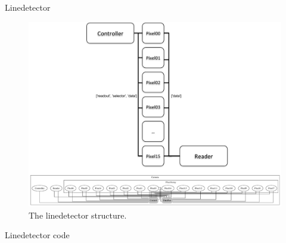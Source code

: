 \documentclass[13pt]{beamer}
\begin{document}
%
\begin{frame}{Linedetector}
     \begin{figure}[!ht]
          \centering
          \includegraphics[scale=0.295]{figures/LineDetect.pdf}
          \caption{The linedetector structure.}
     \end{figure}
\end{frame}

\begin{frame}{Linedetector code}
\end{frame}
\end{document}
